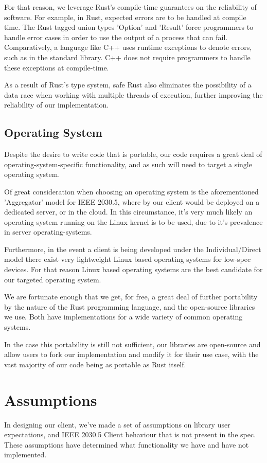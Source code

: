 For that reason, we leverage Rust's compile-time guarantees on the reliability of software. For example, in Rust, expected errors are to be handled at compile time. The Rust tagged union types 'Option' and 'Result' force programmers to handle error cases in order to use the output of a process that can fail. Comparatively, a language like C++ uses runtime exceptions to denote errors, such as in the standard library. C++ does not require programmers to handle these exceptions at compile-time.

As a result of Rust's type system, safe Rust also eliminates the possibility of a data race when working with multiple threads of execution, further improving the reliability of our implementation.

\subsection{Operating System}
Despite the desire to write code that is portable, our code requires a great deal of operating-system-specific functionality, and as such will need to target a single operating system. 

Of great consideration when choosing an operating system is the aforementioned 'Aggregator' model for IEEE 2030.5, where by our client would be deployed on a dedicated server, or in the cloud. In this circumstance, it's very much likely an operating system running on the Linux kernel is to be used, due to it's prevalence in server operating-systems.

Furthermore, in the event a client is being developed under the Individual/Direct model there exist very lightweight Linux based operating systems for low-spec devices. For that reason Linux based operating systems are the best candidate for our targeted operating system.

We are fortunate enough that we get, for free, a great deal of further portability by the nature of the Rust programming language, and the open-source libraries we use. Both have implementations for a wide variety of common operating systems. \cite{RustPlatforms} \cite{TokioDocs}

In the case this portability is still not sufficient, our libraries are open-source and allow users to fork our implementation and modify it for their use case, with the vast majority of our code being as portable as Rust itself.
    
\section{Assumptions}
In designing our client, we've made a set of assumptions on library user expectations, and IEEE 2030.5 Client behaviour that is not present in the spec. These assumptions have determined what functionality we have and have not implemented.

